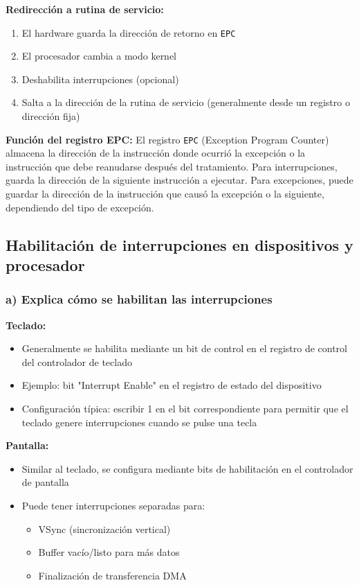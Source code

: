 \documentclass[12pt]{article}
\begin{document}
\textbf{Redirección a rutina de servicio:}
\begin{enumerate}
	\item El hardware guarda la dirección de retorno en \texttt{EPC}
	\item El procesador cambia a modo kernel
	\item Deshabilita interrupciones (opcional)
	\item Salta a la dirección de la rutina de servicio (generalmente desde un registro o dirección fija)
\end{enumerate}

\textbf{Función del registro EPC:}
El registro \texttt{EPC} (Exception Program Counter) almacena la dirección de la instrucción donde ocurrió la excepción o la instrucción que debe reanudarse después del tratamiento. Para interrupciones, guarda la dirección de la siguiente instrucción a ejecutar. Para excepciones, puede guardar la dirección de la instrucción que causó la excepción o la siguiente, dependiendo del tipo de excepción.

\subsection{Habilitación de interrupciones en dispositivos y procesador}

\subsubsection{a) Explica cómo se habilitan las interrupciones}

\textbf{Teclado:}
\begin{itemize}
	\item Generalmente se habilita mediante un bit de control en el registro de control del controlador de teclado
	\item Ejemplo: bit "Interrupt Enable" en el registro de estado del dispositivo
	\item Configuración típica: escribir 1 en el bit correspondiente para permitir que el teclado genere interrupciones cuando se pulse una tecla
\end{itemize}

\textbf{Pantalla:}
\begin{itemize}
	\item Similar al teclado, se configura mediante bits de habilitación en el controlador de pantalla
	\item Puede tener interrupciones separadas para:
	\begin{itemize}
		\item VSync (sincronización vertical)
		\item Buffer vacío/listo para más datos
		\item Finalización de transferencia DMA
	\end{itemize}
\end{itemize}
\end{document}
